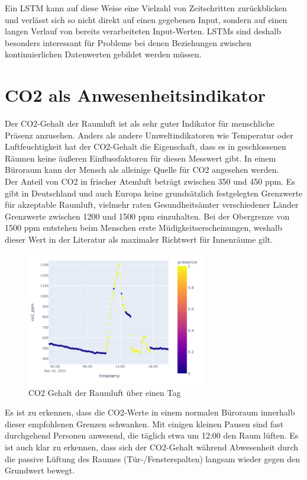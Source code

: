 Ein LSTM kann auf diese Weise eine Vielzahl von Zeitschritten zurückblicken und verlässt sich so nicht direkt auf 
einen gegebenen Input, sondern auf einen langen Verlauf von bereits verarbeiteten Input-Werten. 
LSTMs sind deshalb besonders interessant für Probleme bei denen Beziehungen zwischen kontinuierlichen 
Datenwerten gebildet werden müssen.\newpage

\section{CO2 als Anwesenheitsindikator}\label{CO2}

Der CO2-Gehalt der Raumluft ist als sehr guter Indikator für menschliche Präsenz anzusehen. Anders als andere 
Umweltindikatoren wie Temperatur oder Luftfeuchtigkeit hat der CO2-Gehalt die Eigenschaft, dass es in 
geschlossenen Räumen keine äußeren Einflussfaktoren für diesen Messwert gibt. In einem Büroraum kann der 
Mensch als alleinige Quelle für CO2 angesehen werden.\\
Der Anteil von CO2 in frischer Atemluft beträgt zwischen 350 und 450 ppm. Es gibt in Deutschland und auch Europa 
keine grundsätzlich festgelegten Grenzwerte für akzeptable Raumluft, vielmehr raten Gesundheitsämter 
verschiedener Länder Grenzwerte zwischen 1200 und 1500 ppm einzuhalten. Bei der Obergrenze von 1500 ppm 
entstehen beim Menschen erste Müdigkeitserscheinungen, weshalb dieser Wert in der Literatur als maximaler 
Richtwert für Innenräume gilt.

\begin{figure}[h]
    \centering
    \includegraphics[width=0.7\textwidth]{pic/co2_singleDay.png}
    \caption{CO2 Gehalt der Raumluft über einen Tag}
    \label{fig:CO2_oneDay}
\end{figure}
 
Es ist zu erkennen, dass die CO2-Werte in einem normalen Büroraum innerhalb dieser empfohlenen Grenzen schwanken.
Mit einigen kleinen Pausen sind fast durchgehend Personen anwesend, die täglich etwa um 12:00 den Raum lüften.
Es ist auch klar zu erkennen, dass sich der CO2-Gehalt während Abwesenheit durch die passive Lüftung des Raumes  
(Tür-/Fensterspalten) langsam wieder gegen den Grundwert bewegt.

